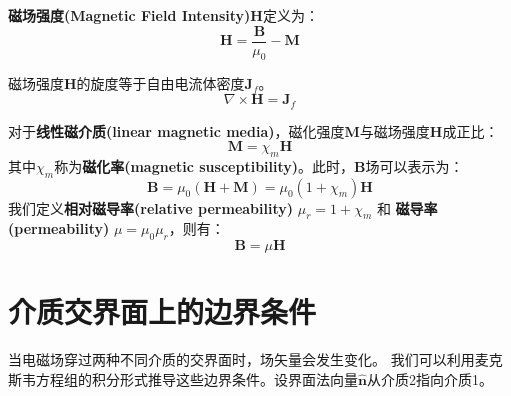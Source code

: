 \documentclass[fontset=none]{ctexart}
\begin{document}
\begin{definition}[磁场强度]
    \textbf{磁场强度(Magnetic Field Intensity)}$\bm{H}$定义为：
    \begin{equation}
        \bm{H} = \frac{\bm{B}}{\mu_0} - \bm{M}
    \end{equation}
\end{definition}
\begin{law}[介质中的安培定律]
    磁场强度$\bm{H}$的旋度等于自由电流体密度$\bm{J}_f$。
    \begin{equation}
        \nabla \times \bm{H} = \bm{J}_f
    \end{equation}
\end{law}

对于\textbf{线性磁介质(linear magnetic media)}，磁化强度$\bm{M}$与磁场强度$\bm{H}$成正比：
\begin{equation}
    \bm{M} = \chi_m \bm{H}
\end{equation}
其中$\chi_m$称为\textbf{磁化率(magnetic susceptibility)}。此时，$\bm{B}$场可以表示为：
\begin{equation}
    \bm{B} = \mu_0 (\bm{H} + \bm{M}) = \mu_0 (1 + \chi_m) \bm{H}
\end{equation}
我们定义\textbf{相对磁导率(relative permeability)} $\mu_r = 1+\chi_m$ 
和 \textbf{磁导率(permeability)} $\mu = \mu_0 \mu_r$，则有：
\begin{equation}
    \bm{B} = \mu \bm{H}
\end{equation}

\section{介质交界面上的边界条件}
当电磁场穿过两种不同介质的交界面时，场矢量会发生变化。
我们可以利用麦克斯韦方程组的积分形式推导这些边界条件。设界面法向量$\hat{\bm{n}}$从介质2指向介质1。
\end{document}
